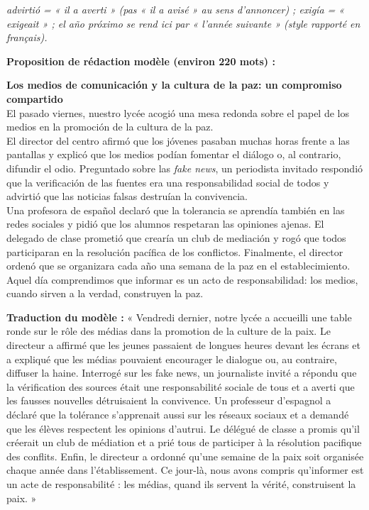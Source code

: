 \documentclass[11pt]{article}
\newcommand{\esp}[1]{\ifmmode\text{\textit{#1}}\else\begingroup\selectlanguage{spanish}\itshape #1\endgroup\fi}
\begin{document}
\begin{attention}
\esp{advirtió} = « il a averti » (pas « il a avisé » au sens d'annoncer) ; \esp{exigía} = « exigeait » ; \esp{el año próximo} se rend ici par « l'année suivante » (style rapporté en français).
\end{attention}


\begin{corrige}
\textbf{Proposition de rédaction modèle (environ 220 mots) :}
\begin{textebox}
\textbf{Los medios de comunicación y la cultura de la paz: un compromiso compartido}\\[2pt]
El pasado viernes, nuestro lycée acogió una mesa redonda sobre el papel de los medios en la promoción de la cultura de la paz.\\[4pt]
El director del centro afirmó que los jóvenes pasaban muchas horas frente a las pantallas y explicó que los medios podían fomentar el diálogo o, al contrario, difundir el odio. Preguntado sobre las \emph{fake news}, un periodista invitado respondió que la verificación de las fuentes era una responsabilidad social de todos y advirtió que las noticias falsas destruían la convivencia.\\[4pt]
Una profesora de español declaró que la tolerancia se aprendía también en las redes sociales y pidió que los alumnos respetaran las opiniones ajenas. El delegado de clase prometió que crearía un club de mediación y rogó que todos participaran en la resolución pacífica de los conflictos. Finalmente, el director ordenó que se organizara cada año una semana de la paz en el establecimiento.\\[4pt]
Aquel día comprendimos que informar es un acto de responsabilidad: los medios, cuando sirven a la verdad, construyen la paz.
\end{textebox}
\textbf{Traduction du modèle :} « Vendredi dernier, notre lycée a accueilli une table ronde sur le rôle des médias dans la promotion de la culture de la paix. Le directeur a affirmé que les jeunes passaient de longues heures devant les écrans et a expliqué que les médias pouvaient encourager le dialogue ou, au contraire, diffuser la haine. Interrogé sur les fake news, un journaliste invité a répondu que la vérification des sources était une responsabilité sociale de tous et a averti que les fausses nouvelles détruisaient la convivence. Un professeur d'espagnol a déclaré que la tolérance s'apprenait aussi sur les réseaux sociaux et a demandé que les élèves respectent les opinions d'autrui. Le délégué de classe a promis qu'il créerait un club de médiation et a prié tous de participer à la résolution pacifique des conflits. Enfin, le directeur a ordonné qu'une semaine de la paix soit organisée chaque année dans l'établissement. Ce jour-là, nous avons compris qu'informer est un acte de responsabilité : les médias, quand ils servent la vérité, construisent la paix. »\\

\end{corrige}
\end{document}
